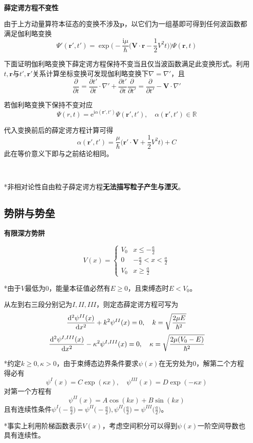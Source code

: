 \documentclass[a4paper,UTF8,fontset=windows]{ctexart}
\newcommand*{\dr}{\hspace{0.07em}\mathrm{d}}
\newcommand*{\ir}{\mathrm{i}}
\newcommand*{\er}{\mathrm{e}}
\newcommand*{\br}{\mathbf{r}}
\newcommand*{\bp}{\mathbf{p}}
\begin{document}
\

\textbf{薛定谔方程不变性}

由于上方动量算符本征态的变换不涉及$\bp$，以它们为一组基即可得到任何波函数都满足伽利略变换
$$\Psi'(\br',t')=\exp\bigg(-\frac{\ir\mu}{\hbar}\bigg(\mathbf{V}\cdot\br-\frac{1}{2}V^2t\bigg)\bigg)\Psi(\br,t)$$

下面证明伽利略变换下薛定谔方程保持不变当且仅当波函数满足此变换形式。利用$t,\br$与$t',\br'$关系计算坐标变换可发现伽利略变换下$\nabla=\nabla'$，且
$$\frac{\partial}{\partial t}=\frac{\partial t'}{\partial t}\cdot\nabla'+\frac{\partial t'}{\partial t}\frac{\partial}{\partial t'}=\frac{\partial}{\partial t'}-\mathbf{V}\cdot\nabla'$$

若伽利略变换下保持不变对应
$$\Psi(r,t)=\er^{\ir\alpha(\br',t')}\Psi(\br',t'),\quad\alpha(\br',t')\in\mathbb{R}$$

代入变换前后的薛定谔方程计算可得
$$\alpha(\br',t')=\frac{\mu}{\hbar}\bigg(\br'\cdot\mathbf{V}+\frac{1}{2}V^2t\bigg)+C$$
此在等价意义下即与之前结论相同。

\

*非相对论性自由粒子薛定谔方程\textbf{无法描写粒子产生与湮灭}。

\subsection{势阱与势垒}
\textbf{有限深方势阱}

$$V(x)=\begin{cases}V_0&x\le-\frac{a}{2}\\0&-\frac{a}{2}<x<\frac{a}{2}\\V_0&x\ge\frac{a}{2}\end{cases}$$

*由于$V$最低为0，能量本征值必然有$E\ge0$，且束缚态时$E<V_0$。

从左到右三段分别记为$I,II,III$，则定态薛定谔方程可写为
$$\frac{\dr^2\psi^{II}(x)}{\dr x^2}+k^2\psi^{II}(x)=0,\quad k=\sqrt{\frac{2\mu E}{\hbar^2}}$$
$$\frac{\dr^2\psi^{I,III}(x)}{\dr x^2}-\kappa^2\psi^{I,III}(x)=0,\quad \kappa=\sqrt{\frac{2\mu(V_0-E)}{\hbar^2}}$$

*约定$k\ge0,\kappa>0$，由于束缚态边界条件要求$\psi(x)$在无穷处为0，解第二个方程得必有
$$\psi^I(x)=C\exp(\kappa x),\quad\psi^{III}(x)=D\exp(-\kappa x)$$
对第一个方程有
$$\psi^{II}(x)=A\cos(kx)+B\sin(kx)$$
且有连续性条件$\psi^I\big(-\frac{a}{2}\big)=\psi^{II}\big(-\frac{a}{2}\big),\psi^{II}\big(\frac{a}{2}\big)=\psi^{III}\big(\frac{a}{2}\big)$。

*事实上利用阶梯函数表示$V(x)$，考虑空间积分可以得到$\psi(x)$一阶空间导数也具有连续性。
\end{document}
